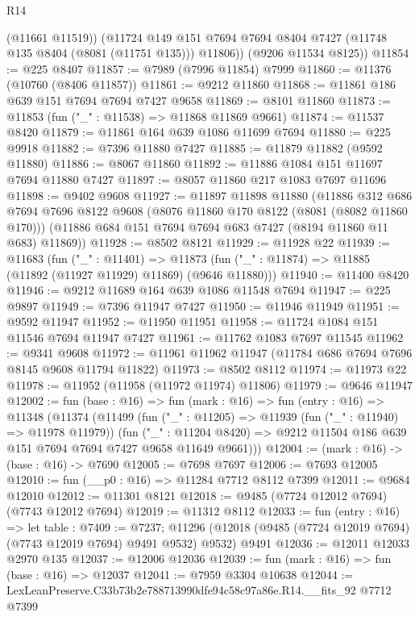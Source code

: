 \begin{lexlean}{R14}
\begin{coremodule}
          (@11661 @11519))
        (@11724 @149 @151 @7694 @7694 @8404 @7427 (@11748 @135 @8404 (@8081 (@11751 @135))) @11806))
      (@9206 @11534 @8125))
@11854 := @225 @8407
@11857 := @7989 (@7996 @11854) @7999
@11860 := @11376 (@10760 (@8406 @11857))
@11861 := @9212 @11860
@11868 := @11861 @186 @639 @151 @7694 @7694 @7427 @9658
@11869 := @8101 @11860
@11873 := @11853 (fun ("_" : @11538) => @11868 @11869 @9661)
@11874 := @11537 @8420
@11879 := @11861 @164 @639 @1086 @11699 @7694
@11880 := @225 @9918
@11882 := @7396 @11880 @7427
@11885 := @11879 @11882 (@9592 @11880)
@11886 := @8067 @11860
@11892 := @11886 @1084 @151 @11697 @7694 @11880 @7427
@11897 := @8057 @11860 @217 @1083 @7697 @11696
@11898 := @9402 @9608
@11927 := @11897
    @11898
    @11880
    (@11886
      @312
      @686
      @7694
      @7696
      @8122
      @9608
      (@8076 @11860 @170 @8122 (@8081 (@8082 @11860 @170)))
      (@11886 @684 @151 @7694 @7694 @683 @7427 (@8194 @11860 @11 @683) @11869))
@11928 := @8502 @8121
@11929 := @11928 @22
@11939 := @11683
    (fun ("_" : @11401) =>
    @11873 (fun ("_" : @11874) => @11885 (@11892 (@11927 @11929) @11869) (@9646 @11880)))
@11940 := @11400 @8420
@11946 := @9212 @11689 @164 @639 @1086 @11548 @7694
@11947 := @225 @9897
@11949 := @7396 @11947 @7427
@11950 := @11946 @11949
@11951 := @9592 @11947
@11952 := @11950 @11951
@11958 := @11724 @1084 @151 @11546 @7694 @11947 @7427
@11961 := @11762 @1083 @7697 @11545
@11962 := @9341 @9608
@11972 := @11961 @11962 @11947 (@11784 @686 @7694 @7696 @8145 @9608 @11794 @11822)
@11973 := @8502 @8112
@11974 := @11973 @22
@11978 := @11952 (@11958 (@11972 @11974) @11806)
@11979 := @9646 @11947
@12002 := fun (base : @16) =>
  fun (mark : @16) =>
  fun (entry : @16) =>
  @11348
    (@11374
      (@11499
        (fun ("_" : @11205) => @11939 (fun ("_" : @11940) => @11978 @11979))
        (fun ("_" : @11204 @8420) =>
        @9212 @11504 @186 @639 @151 @7694 @7694 @7427 @9658 @11649 @9661)))
@12004 := (mark : @16) -> (base : @16) -> @7690
@12005 := @7698 @7697
@12006 := @7693 @12005
@12010 := fun (__p0 : @16) => @11284 @7712 @8112 @7399
@12011 := @9684 @12010
@12012 := @11301 @8121
@12018 := @9485 (@7724 @12012 @7694) (@7743 @12012 @7694)
@12019 := @11312 @8112
@12033 := fun (entry : @16) =>
  let table : @7409 := @7237;
  @11296 (@12018 (@9485 (@7724 @12019 @7694) (@7743 @12019 @7694) @9491 @9532) @9532) @9491
@12036 := @12011 @12033 @2970 @135
@12037 := @12006 @12036
@12039 := fun (mark : @16) => fun (base : @16) => @12037
@12041 := @7959 @3304 @10638
@12044 := LexLeanPreserve.C33b73b2e788713990dfe94c58c97a86e.R14.__fits_92 @7712 @7399

\end{coremodule}
\end{lexlean}
